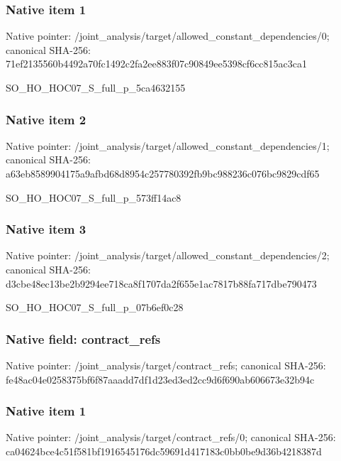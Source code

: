 \documentclass[10pt,a4paper]{article}
\begin{document}
\subsubsection{Native item 1}
Native pointer: /joint\_\allowbreak{}analysis/target/allowed\_\allowbreak{}constant\_\allowbreak{}dependencies/0; canonical SHA-256: 71ef2135560b4492a70fc1492c2fa2ee883f07c90849ee5398cf6cc815ac3ca1

\begingroup\raggedright\sloppy SO\_\allowbreak{}HO\_\allowbreak{}HOC07\_\allowbreak{}S\_\allowbreak{}full\_\allowbreak{}p\_\allowbreak{}5ca4632155\par\endgroup

\subsubsection{Native item 2}
Native pointer: /joint\_\allowbreak{}analysis/target/allowed\_\allowbreak{}constant\_\allowbreak{}dependencies/1; canonical SHA-256: a63eb8589904175a9afbd68d8954c257780392fb9bc988236c076bc9829cdf65

\begingroup\raggedright\sloppy SO\_\allowbreak{}HO\_\allowbreak{}HOC07\_\allowbreak{}S\_\allowbreak{}full\_\allowbreak{}p\_\allowbreak{}573ff14ac8\par\endgroup

\subsubsection{Native item 3}
Native pointer: /joint\_\allowbreak{}analysis/target/allowed\_\allowbreak{}constant\_\allowbreak{}dependencies/2; canonical SHA-256: d3cbe48ec13be2b9294ee718ca8f1707da2f655e1ac7817b88fa717dbe790473

\begingroup\raggedright\sloppy SO\_\allowbreak{}HO\_\allowbreak{}HOC07\_\allowbreak{}S\_\allowbreak{}full\_\allowbreak{}p\_\allowbreak{}07b6ef0c28\par\endgroup

\subsubsection{Native field: contract\_\allowbreak{}refs}
Native pointer: /joint\_\allowbreak{}analysis/target/contract\_\allowbreak{}refs; canonical SHA-256: fe48ac04e0258375bf6f87aaadd7df1d23ed3ed2cc9d6f690ab606673e32b94c

\subsubsection{Native item 1}
Native pointer: /joint\_\allowbreak{}analysis/target/contract\_\allowbreak{}refs/0; canonical SHA-256: ca04624bce4c51f581bf1916545176dc59691d417183c0bb0be9d36b4218387d
\end{document}
